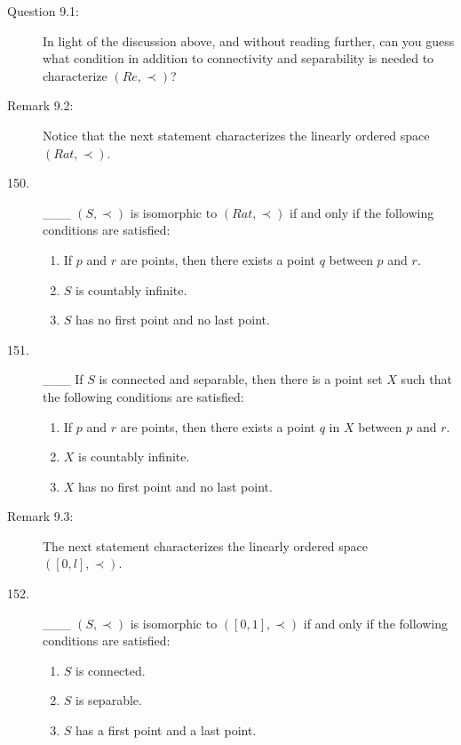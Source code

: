 \documentclass{book}
\begin{document}
\begin{description}

\item[Question 9.1:] In light of the discussion above, and without reading further, can you guess what condition in addition to connectivity and separability is needed to characterize $(Re, \prec)$?

\item[Remark 9.2:] Notice that the next statement characterizes the linearly ordered space $(Rat, \prec)$.

\item[150.] \_\_\_ $(S, \prec)$ is isomorphic to $(Rat, \prec)$ if and only if the following conditions are satisfied:
\begin{enumerate}[\hspace{1cm}(a)]
  \item If $p$ and $r$ are points, then there exists a point $q$ between $p$ and $r$.
  \item $S$ is countably infinite.
  \item $S$ has no first point and no last point.
\end{enumerate}

\item[151.] \_\_\_ If $S$ is connected and separable, then there is a point set $X$ such that the following conditions are satisfied:
\begin{enumerate}[\hspace{1cm}(a)]
  \item If $p$ and $r$ are points, then there exists a point $q$ in $X$ between $p$ and $r$. 
  \item $X$ is countably infinite.
  \item $X$ has no first point and no last point.
\end{enumerate}

\item[Remark 9.3:] The next statement characterizes the linearly ordered space $\ \ $ $([0,l], \prec)$.

\item[152.] \_\_\_ $(S, \prec)$ is isomorphic to $([0,1], \prec)$ if and only if the following conditions are satisfied:
\begin{enumerate}[\hspace{1cm}(a)]
  \item $S$ is connected.
  \item $S$ is separable.
  \item $S$ has a first point and a last point.
\end{enumerate}


\end{description}
\end{document}
